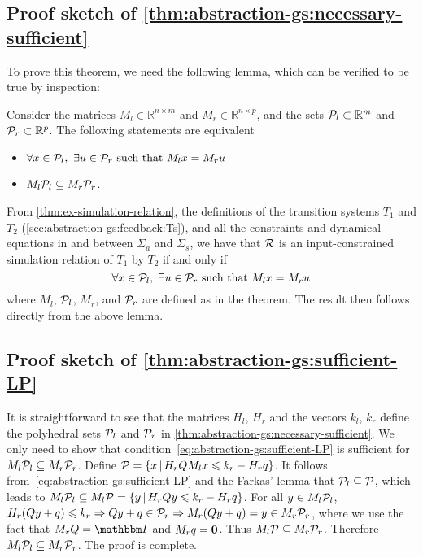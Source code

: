 \subsection{Proof sketch of \protect\cref{thm:abstraction-gs:necessary-sufficient}}
\label{sec:proof:abstraction-gs:necessary-sufficient}

To prove this theorem, we need the following lemma, which can be verified to be true by inspection:
\begin{lemma}\label{lem:1}
Consider the matrices $M_{l} \in \mathbb{R}^{n\times m}$ and $M_{r} \in \mathbb{R}^{n\times p}$, and the sets $\mathcal{P}_{l} \subset \mathbb{R}^m$ and $\mathcal{P}_{r} \subset \mathbb{R}^p$. The following statements are equivalent
\begin{itemize}
	\item $\forall x \in \mathcal{P}_{l},\ \exists u \in \mathcal{P}_{r} \text{ such that } M_{l} x = M_{r} u$
	\item $M_{l} \mathcal{P}_{l} \subseteq M_{r} \mathcal{P}_{r}$.
\end{itemize}
\end{lemma}

From %
\cref{thm:ex-simulation-relation}, the definitions of the transition systems $T_{1}$ and $T_{2}$ (\cref{sec:abstraction-gs:feedback:Ts}), and all the constraints and dynamical equations in and between $\Sigma_{a}$ and $\Sigma_{s}$, we have that $\mathcal{R}$ is an input-constrained simulation relation of $T_{1}$ by $T_{2}$ if and only if
\[\forall x \in \PSet_{l},\ \exists u \in \PSet_{r} \text{ such that } M_{l} x = M_{r} u\]
where $M_{l}$, $\mathcal{P}_{l}$, $M_{r}$, and $\mathcal{P}_{r}$ are defined as in the theorem.
The result then follows directly from the above lemma.


\subsection{Proof sketch of \protect\cref{thm:abstraction-gs:sufficient-LP}}
\label{sec:proofs:abstraction-gs:sufficient-LP}

It is straightforward to see that the matrices $H_{l}$, $H_{r}$ and the vectors $k_{l}$, $k_{r}$ define the polyhedral sets $\mathcal{P}_{l}$ and $\mathcal{P}_{r}$ in \cref{thm:abstraction-gs:necessary-sufficient}.
We only need to show that condition~\eqref{eq:abstraction-gs:sufficient-LP} is sufficient for $M_{l} \mathcal{P}_{l} \subseteq M_{r} \mathcal{P}_{r}$.
Define $\mathcal{P} = \{ x \,|\, H_{r} Q M_{l} x \leqslant k_{r} - H_{r} q \}$.
It follows from~\eqref{eq:abstraction-gs:sufficient-LP} and the Farkas' lemma that
$\mathcal{P}_{l} \subseteq \mathcal{P}$, which leads to $M_{l} \mathcal{P}_{l} \subseteq M_{l} \mathcal{P} = \{ y \,|\, H_{r} Q y \leqslant k_{r} - H_{r} q \}$.
For all $y \in M_{l} \mathcal{P}_{l}$, $H_{r} (Q y + q) \leqslant k_{r} \Rightarrow Q y + q \in \mathcal{P}_{r} \Rightarrow M_{r} (Q y + q) = y \in M_{r} \mathcal{P}_{r}$, where we use the fact that $M_{r} Q = \IdentityMatrix$ and $M_{r} q = \mathbf{0}$.
Thus $M_{l} \mathcal{P} \subseteq M_{r} \mathcal{P}_{r}$.
Therefore $M_{l} \mathcal{P}_{l} \subseteq M_{r} \mathcal{P}_{r}$.
The proof is complete.


